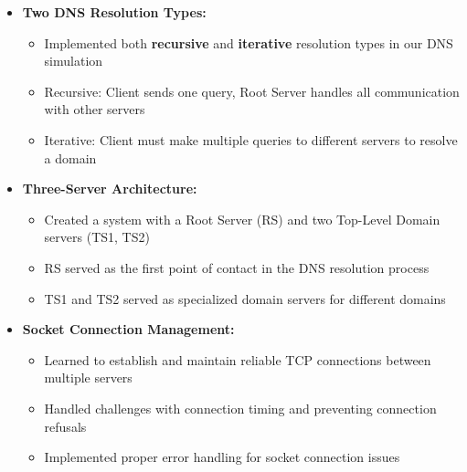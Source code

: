 \documentclass{article}
\begin{document}
\begin{itemize}
    \item \textbf{Two DNS Resolution Types:}
    \begin{itemize}
      \item Implemented both \textbf{recursive} and \textbf{iterative} resolution types in our DNS simulation
      \item Recursive: Client sends one query, Root Server handles all communication with other servers
      \item Iterative: Client must make multiple queries to different servers to resolve a domain
    \end{itemize}
  
    \item \textbf{Three-Server Architecture:}
    \begin{itemize}
      \item Created a system with a Root Server (RS) and two Top-Level Domain servers (TS1, TS2)
      \item RS served as the first point of contact in the DNS resolution process
      \item TS1 and TS2 served as specialized domain servers for different domains
    \end{itemize}
  
    \item \textbf{Socket Connection Management:}
    \begin{itemize}
      \item Learned to establish and maintain reliable TCP connections between multiple servers
      \item Handled challenges with connection timing and preventing connection refusals
      \item Implemented proper error handling for socket connection issues
    \end{itemize}
  \end{itemize}
\end{document}
